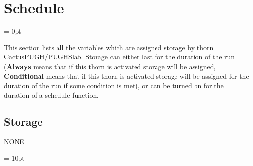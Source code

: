 
\section{Schedule} 


\parskip = 0pt


\noindent This section lists all the variables which are assigned storage by thorn CactusPUGH/PUGHSlab.  Storage can either last for the duration of the run ({\bf Always} means that if this thorn is activated storage will be assigned, {\bf Conditional} means that if this thorn is activated storage will be assigned for the duration of the run if some condition is met), or can be turned on for the duration of a schedule function.


\subsection*{Storage}NONE

\vspace{5mm}\parskip = 10pt 
